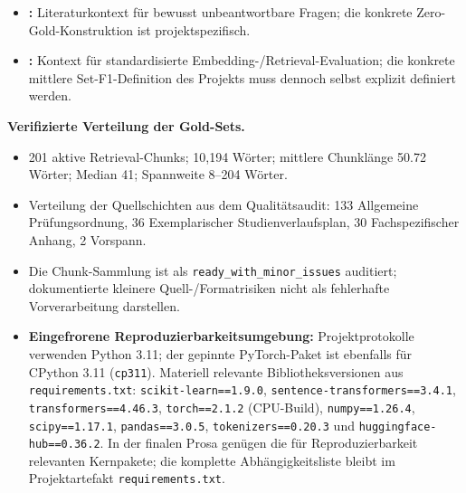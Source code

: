 \documentclass[11pt]{article}
\begin{document}
\begin{quellenbox}
\begin{itemize}
    \item \textbf{\citet{rajpurkar-etal-2018-know}:} Literaturkontext f\"ur bewusst unbeantwortbare Fragen; die konkrete Zero-Gold-Konstruktion ist projektspezifisch.
    \item \textbf{\citet{muennighoff-etal-2023-mteb}:} Kontext f\"ur standardisierte Embedding-/Retrieval-Evaluation; die konkrete mittlere Set-F1-Definition des Projekts muss dennoch selbst explizit definiert werden.
\end{itemize}
\end{quellenbox}

\begin{faktenbox}
\begin{center}
\small
\textbf{Verifizierte Verteilung der Gold-Sets.}\\[1ex]
\end{center}

\vspace{1ex}
\begin{itemize}
    \item 201 aktive Retrieval-Chunks; 10,194 W\"orter; mittlere Chunkl\"ange 50.72 W\"orter; Median 41; Spannweite 8--204 W\"orter.
    \item Verteilung der Quellschichten aus dem Qualitätsaudit: 133 Allgemeine Prüfungsordnung, 36 Exemplarischer Studienverlaufsplan, 30 Fachspezifischer Anhang, 2 Vorspann.
    \item Die Chunk-Sammlung ist als \texttt{ready\_with\_minor\_issues} auditiert; dokumentierte kleinere Quell-/Formatrisiken nicht als fehlerhafte Vorverarbeitung darstellen.
    \item \textbf{Eingefrorene Reproduzierbarkeitsumgebung:} Projektprotokolle verwenden Python 3.11; der gepinnte PyTorch-Paket ist ebenfalls f\"ur CPython 3.11 (\texttt{cp311}). Materiell relevante Bibliotheksversionen aus \texttt{requirements.txt}: \texttt{scikit-learn==1.9.0}, \texttt{sentence-transformers==3.4.1}, \texttt{transformers==4.46.3}, \texttt{torch==2.1.2} (CPU-Build), \texttt{numpy==1.26.4}, \texttt{scipy==1.17.1}, \texttt{pandas==3.0.5}, \texttt{tokenizers==0.20.3} und \texttt{huggingface-hub==0.36.2}. In der finalen Prosa gen\"ugen die f\"ur Reproduzierbarkeit relevanten Kernpakete; die komplette Abhängigkeitsliste bleibt im Projektartefakt \texttt{requirements.txt}.
\end{itemize}
\end{faktenbox}
\end{document}
